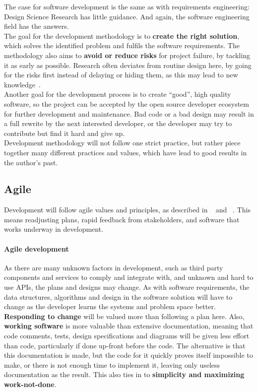 
The case for software development is the same as with requirements engineering: Design Science Research has little guidance.
And again, the software engineering field has the answers.\\

The goal for the development methodology is to \textbf{create the right solution}, which solves the identified problem and fulfils the software requirements.
The methodology also aims to \textbf{avoid or reduce risks} for project failure, by tackling it as early as possible.
Research often deviates from routine design here, by going for the risks first instead of delaying or hiding them, as this may lead to new knowledge~\cite[p.~114]{oatesResearchingInformationSystems2006}.\\

Another goal for the development process is to create ``good'', high quality software, so the project can be accepted by the \gls{open source} developer ecosystem for further development and maintenance.
Bad code or a bad design may result in a full rewrite by the next interested developer, or the developer may try to contribute but find it hard and give up.\\

Development methodology will not follow one strict practice, but rather piece together many different practices and values, which have lead to good results in the author's past.


\subsection{Agile}

Development will follow agile values and principles, as described in ~\cite{kentbeckManifestoAgileSoftware2001} and ~\cite{PrinciplesAgileManifesto}.
This means readjusting plans, rapid feedback from stakeholders, and software that works underway in development.

\paragraph{Agile development}
As there are many unknown factors in development, such as third party components and services to comply and integrate with, and unknown and hard to use \glspl{API}, the plans and designs may change.
As with software requirements, the data structures, algorithms and design in the software solution will have to change as the developer learns the systems and problem space better.
\textbf{Responding to change} will be valued more than following a plan here.
Also, \textbf{working software} is more valuable than extensive documentation, meaning that code comments, tests, design specifications and diagrams will be given less effort than code, particularly if done up-front before the code.
The alternative is that this documentation is made, but the code for it quickly proves itself impossible to make, or there is not enough time to implement it, leaving only useless documentation as the result.
This also ties in to \textbf{simplicity and maximizing work-not-done}.\\

